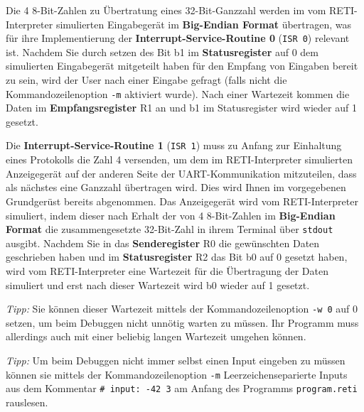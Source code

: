 \documentclass{article}
\begin{document}
{\color{green}
  Die 4 8-Bit-Zahlen zu Übertratung eines 32-Bit-Ganzzahl werden im vom RETI-Interpreter simulierten Eingabegerät im \textbf{Big-Endian Format} übertragen, was für ihre Implementierung der \textbf{Interrupt-Service-Routine 0} (\texttt{ISR 0}) relevant ist. Nachdem Sie durch setzen des Bit b1 im \textbf{Statusregister} auf 0 dem simulierten Eingabegerät mitgeteilt haben für den Empfang von Eingaben bereit zu sein, wird der User nach einer Eingabe gefragt (falls nicht die Kommandozeilenoption \texttt{-m} aktiviert wurde). Nach einer Wartezeit kommen die Daten im \textbf{Empfangsregister} R1 an und b1 im Statusregister wird wieder auf 1 gesetzt. 

  Die \textbf{Interrupt-Service-Routine 1} (\texttt{ISR 1}) muss zu Anfang zur Einhaltung eines Protokolls die Zahl 4 versenden, um dem im RETI-Interpreter simulierten Anzeigegerät auf der anderen Seite der UART-Kommunikation mitzuteilen, dass als nächstes eine Ganzzahl übertragen wird. Dies wird Ihnen im vorgegebenen Grundgerüst bereits abgenommen. Das Anzeigegerät wird vom RETI-Interpreter simuliert, indem dieser nach Erhalt der von 4 8-Bit-Zahlen im \textbf{Big-Endian Format} die zusammengesetzte 32-Bit-Zahl in ihrem Terminal über \verb|stdout| ausgibt. Nachdem Sie in das \textbf{Senderegister} R0 die gewünschten Daten geschrieben haben und im \textbf{Statusregister} R2 das Bit b0 auf 0 gesetzt haben, wird vom RETI-Interpreter eine Wartezeit für die Übertragung der Daten simuliert und erst nach dieser Wartezeit wird b0 wieder auf 1 gesetzt. 

  \textit{Tipp:} Sie können dieser Wartezeit mittels der Kommandozeilenoption \texttt{-w 0} auf 0 setzen, um beim Debuggen nicht unnötig warten zu müssen. Ihr Programm muss allerdings auch mit einer beliebig langen Wartezeit umgehen können.

  \textit{Tipp:} Um beim Debuggen nicht immer selbst einen Input eingeben zu müssen können sie mittels der Kommandozeilenoption \texttt{-m} Leerzeichenseparierte Inputs aus dem Kommentar \verb|# input: -42 3| am Anfang des Programms \verb|program.reti| rauslesen.


}
\end{document}
